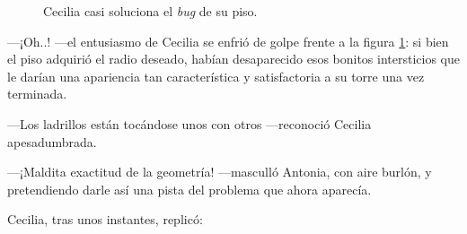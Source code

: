 \begin{figure}[ht]
  \hfill%
          
        \caption{Cecilia casi soluciona el \emph{bug} de su piso.}
      \label{fig:piso-solucion-1}        
    \end{figure}




---¡Oh..! ---el entusiasmo de Cecilia se enfrió de golpe frente a la
figura \ref{fig:piso-solucion-1}: si bien el piso adquirió el radio
deseado, habían desaparecido esos bonitos intersticios que le darían
una apariencia tan característica y satisfactoria a su torre una vez
terminada.
  



---Los ladrillos están tocándose unos con otros ---re\-co\-no\-ció Cecilia
apesadumbrada.

---¡Maldita exactitud de la geometría! ---masculló Antonia, con aire
burlón, y pretendiendo darle así una pista del problema que ahora
aparecía.

Cecilia, tras unos instantes, replicó:

